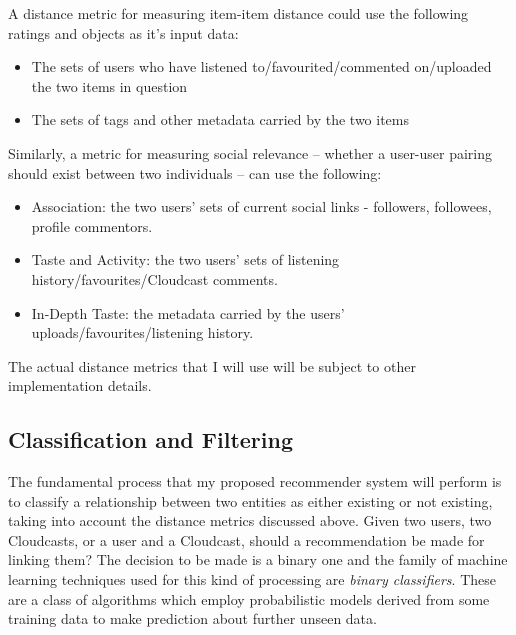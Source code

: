 A distance metric for measuring item-item distance could use the following ratings and objects as it's input data: 
\begin{itemize}
 \item The sets of users who have listened to/favourited/commented on/uploaded the two items in question
 \item The sets of tags and other metadata carried by the two items 
\end{itemize}


Similarly, a metric for measuring social relevance -- whether a user-user pairing should exist between two individuals -- can use the following:
\begin{itemize}
 \item Association: the two users' sets of current social links - followers, followees, profile commentors. 
 \item Taste and Activity: the two users' sets of listening history/favourites/Cloudcast comments.
 \item In-Depth Taste: the metadata carried by the users' uploads/favourites/listening history.
\end{itemize}

The actual distance metrics that I will use will be subject to other implementation details. 



\subsection*{Classification and Filtering}

The fundamental process that my proposed recommender system will perform is to classify a relationship between two entities as either existing or not existing, taking into account the distance metrics discussed above. Given two users, two Cloudcasts, or a user and a Cloudcast, should a recommendation be made for linking them? The decision to be made is a binary one and the family of machine learning techniques used for this kind of processing are \emph{binary classifiers}. These are a class of algorithms which employ probabilistic models derived from some training data to make prediction about further unseen data.


